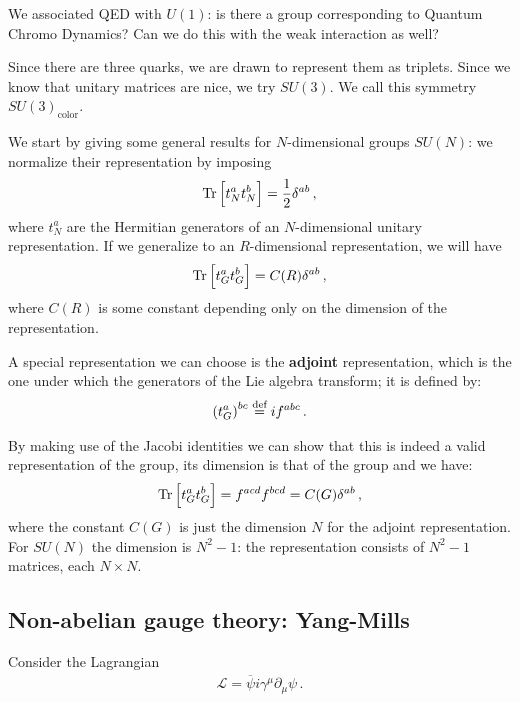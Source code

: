 \documentclass[main.tex]{subfiles}
\begin{document}
We associated QED  with \(U(1)\): is there a group corresponding to Quantum Chromo Dynamics?
Can we do this with the weak interaction as well? 

Since there are three quarks, we are drawn to represent them as triplets. 
Since we know that unitary matrices are nice, we try \(SU(3)\). 
We call this symmetry \(SU(3)_{\text{color}}\). 

We start by giving some general results for \(N\)-dimensional groups \(SU(N)\): we normalize their representation by imposing
%
\begin{align}
\Tr \qty[t^{a}_{N} t^{b}_{N}] = \frac{1}{2} \delta^{ab}
\,,
\end{align}
%
where \(t^{a}_{N}\) are the Hermitian generators of an \(N\)-dimensional unitary representation. If we generalize to an \(R\)-dimensional representation, we will have 
%
\begin{align}
\Tr \qty[t^{a}_{G} t^{b}_{G}] = C(R) \delta^{ab}
\,,
\end{align}
%
where \(C(R)\) is some constant depending only on the dimension of the representation. 

A special representation we can choose is the \textbf{adjoint} representation, which is the one under which the generators of the Lie algebra transform; it is defined by: 
%
\begin{align} \label{eq:adjoint-representation-definition}
\qty(t^{a}_{G})^{bc} \overset{\text{def}}{=} i f^{abc}
\,.
\end{align}

By making use of the Jacobi identities we can show that this is indeed a valid representation of the group, its dimension is that of the group and we have:
%
\begin{align}
\Tr \qty[t^{a}_{G} t^{b}_{G}] = f^{acd} f^{bcd} = C(G) \delta^{ab}
\,,
\end{align}
%
where the constant \(C(G)\) is just the dimension \(N\) for the adjoint representation.
For \(SU(N)\) the dimension is \(N^2 - 1\): the representation consists of \(N^2-1\) matrices, each \(N \times N\).

\subsection{Non-abelian gauge theory: Yang-Mills}

Consider the Lagrangian 
%
\begin{align}
\mathscr{L} = \overline{\psi} i \gamma^{\mu } \partial_{\mu }  \psi 
\,.
\end{align}
\end{document}
